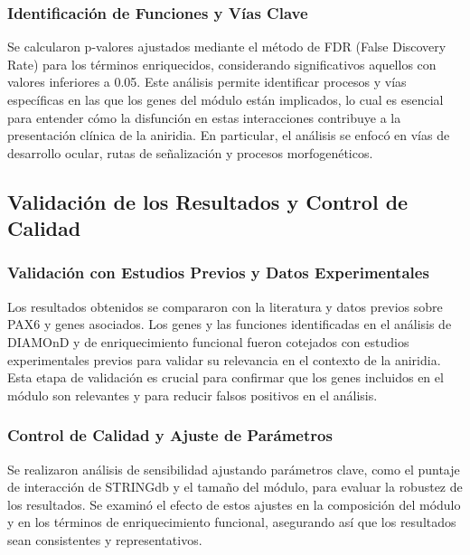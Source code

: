 \subsubsection{Identificación de Funciones y Vías Clave}

Se calcularon p-valores ajustados mediante el método de FDR (False Discovery Rate) para los términos enriquecidos, considerando significativos aquellos con valores inferiores a 0.05. Este análisis permite identificar procesos y vías específicas en las que los genes del módulo están implicados, lo cual es esencial para entender cómo la disfunción en estas interacciones contribuye a la presentación clínica de la aniridia. En particular, el análisis se enfocó en vías de desarrollo ocular, rutas de señalización y procesos morfogenéticos.

\subsection{Validación de los Resultados y Control de Calidad}
\subsubsection{Validación con Estudios Previos y Datos Experimentales}

Los resultados obtenidos se compararon con la literatura y datos previos sobre PAX6 y genes asociados. Los genes y las funciones identificadas en el análisis de DIAMOnD y de enriquecimiento funcional fueron cotejados con estudios experimentales previos para validar su relevancia en el contexto de la aniridia. Esta etapa de validación es crucial para confirmar que los genes incluidos en el módulo son relevantes y para reducir falsos positivos en el análisis.

\subsubsection{Control de Calidad y Ajuste de Parámetros}

Se realizaron análisis de sensibilidad ajustando parámetros clave, como el puntaje de interacción de STRINGdb y el tamaño del módulo, para evaluar la robustez de los resultados. Se examinó el efecto de estos ajustes en la composición del módulo y en los términos de enriquecimiento funcional, asegurando así que los resultados sean consistentes y representativos.
